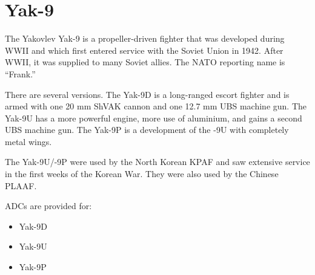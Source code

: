 \section*{Yak-9}

The Yakovlev Yak-9 is a propeller-driven fighter that was developed during WWII and which first entered service with the Soviet Union in 1942. After WWII, it was supplied to many Soviet allies. The NATO reporting name is “Frank.”

There are several versions. The Yak-9D is a long-ranged escort fighter and is armed with one 20 mm ShVAK cannon and one 12.7 mm UBS machine gun. The Yak-9U has a more powerful engine, more use of aluminium, and gains a second UBS machine gun. The Yak-9P is a development of the -9U with completely metal wings.

The Yak-9U/-9P were used by the North Korean KPAF and saw extensive service in the first weeks of the Korean War. They were also used by the Chinese PLAAF.

ADCs are provided for:
\begin{itemize}
\item Yak-9D
\item Yak-9U
\item Yak-9P
\end{itemize}
